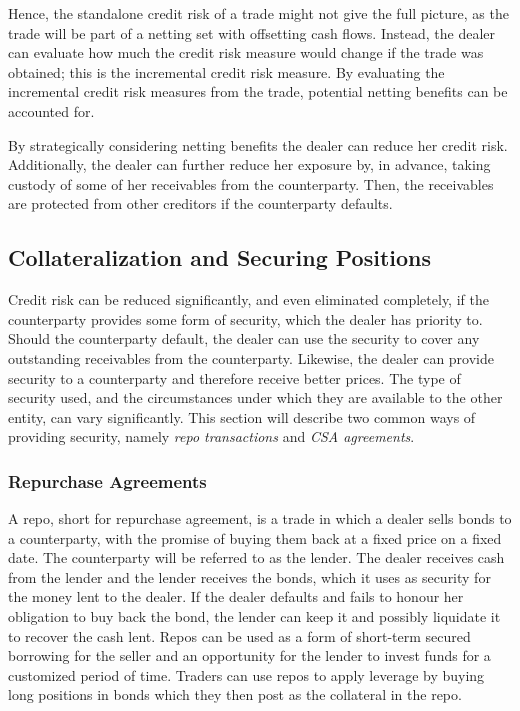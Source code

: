 \documentclass[main.tex]{subfiles}
\begin{document}
        Hence, the standalone credit risk of a trade might not give the full picture,
        as the trade will be part of a netting set with offsetting cash flows.
        Instead, the dealer can evaluate how much the credit risk measure
        would change if the trade was obtained; this is the incremental credit risk measure.
        By evaluating the incremental credit risk measures from the trade,
        potential netting benefits can be accounted for. 

        By strategically considering netting benefits the dealer can reduce her credit risk. 
        Additionally, the dealer can further reduce her exposure by, in advance,
        taking custody of some of her receivables from the counterparty.
        Then, the receivables are protected from other creditors if the counterparty defaults.

    \subsection{Collateralization and Securing Positions}
        Credit risk can be reduced significantly, and even eliminated completely,
        if the counterparty provides some form of security, which the dealer has priority to.
        Should the counterparty default, the dealer can use the security to cover any
        outstanding receivables from the counterparty. 
        Likewise, the dealer can provide security to a counterparty and 
        therefore receive better prices.
        The type of security used, and the circumstances 
        under which they are available to the other entity, can vary significantly.
        This section will describe two common ways of providing security, 
        namely \textit{repo transactions} and \textit{CSA agreements}.

        \subsubsection{Repurchase Agreements}
        A repo, short for repurchase agreement, is a trade in which a dealer 
        sells bonds to a counterparty,
        with the promise of buying them back at a fixed price on a fixed date.
        The counterparty will be referred to as the lender.
        The dealer receives cash from the lender and the lender receives the bonds,
        which it uses as security for the money lent to the dealer. 
        If the dealer defaults and fails to honour her obligation to buy back the bond,
        the lender can keep it and possibly liquidate it to recover the cash lent. 
        Repos can be used as a form of short-term secured borrowing for the seller
        and an opportunity for the lender to invest funds for a customized period of time. 
        Traders can use repos to apply leverage by buying long positions in bonds 
        which they then post as the collateral in the repo. 
\end{document}
